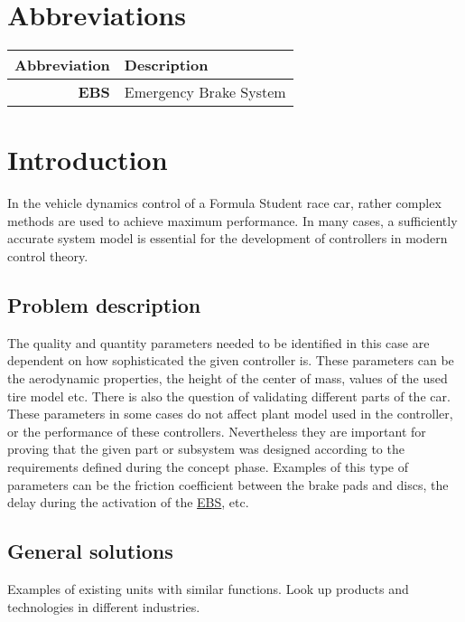 \documentclass[12pt,a4paper]{article}
\begin{document}
    \FRTtitle %

\section*{Abbreviations}

	\begin{table}[H]
		\centering
		\begin{tabular}{r l}
			\textbf{Abbreviation}& \textbf{Description} \\
			\hline
			\textbf{EBS}& Emergency Brake System\label{abbr:EBS} \\
			
		\end{tabular}
	\end{table}

\newpage

\section*{Introduction}
	In the vehicle dynamics control of a Formula Student race car, rather complex methods are used to achieve maximum performance. In many cases, a sufficiently accurate system model is essential for the development of controllers in modern control theory.
		
	\subsection*{Problem description}
		 The quality and quantity parameters needed to be identified in this case are dependent on how sophisticated the given controller is. These parameters can be the aerodynamic properties, the height of the center of mass, values of the used tire model etc. There is also the question of validating different parts of the car. These parameters in some cases do not affect plant model used in the controller, or the performance of these controllers. Nevertheless they are important for proving that the given part or subsystem was designed according to the requirements defined during the concept phase. Examples of this type of parameters can be the friction coefficient between the brake pads and discs, the delay during the activation of the \hyperref[abbr:EBS]{EBS}, etc.
		
	\subsection*{General solutions}
		Examples of existing units with similar functions. Look up products and technologies in different industries.		
\end{document}

